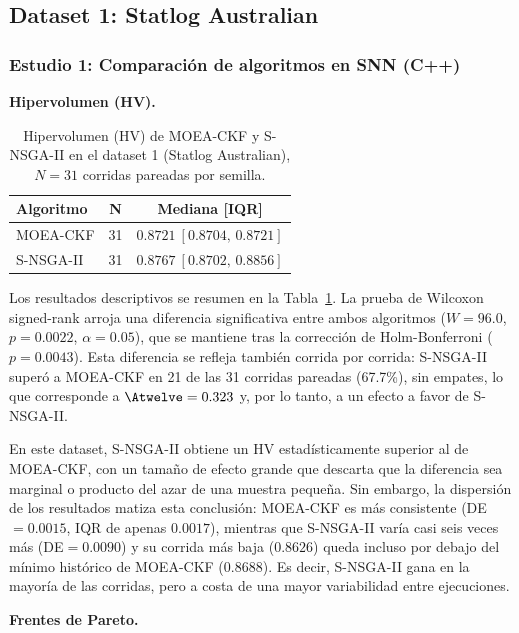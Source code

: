 \subsection{Dataset 1: Statlog Australian}
\label{sec:ds1}

\subsubsection{Estudio 1: Comparación de algoritmos en SNN (C++)}
\label{sec:ds1-estudio1}

\textbf{Hipervolumen (HV).}\label{sec:ds1-hv}

\begin{table}[htbp]
\centering
\small
\caption{Hipervolumen (HV) de MOEA-CKF y S-NSGA-II en el dataset 1 (Statlog Australian), $N=31$
corridas pareadas por semilla.}
\label{tab:hv-ds1}
\begin{tabular}{lcc}
\toprule
\textbf{Algoritmo} & \textbf{N} & \textbf{Mediana [IQR]} \\
\midrule
MOEA-CKF & 31 & $0.8721\ [0.8704,\,0.8721]$ \\
S-NSGA-II & 31 & $0.8767\ [0.8702,\,0.8856]$ \\
\bottomrule
\end{tabular}
\end{table}

Los resultados descriptivos se resumen en la Tabla~\ref{tab:hv-ds1}. La prueba de Wilcoxon signed-rank arroja una diferencia significativa entre ambos algoritmos ($W=96.0$, $p=0.0022$, $\alpha=0.05$), que se mantiene tras la corrección de Holm-Bonferroni ($p=0.0043$). Esta diferencia se refleja también corrida por corrida: S-NSGA-II superó a MOEA-CKF en 21 de las 31 corridas pareadas (67.7\%), sin empates, lo que corresponde a $\Atwelve=0.323$ y, por lo tanto, a un efecto a favor de S-NSGA-II.

En este dataset, S-NSGA-II obtiene un HV estadísticamente superior al de MOEA-CKF, con un tamaño de efecto grande que descarta que la diferencia sea marginal o producto del azar de una muestra pequeña. Sin embargo, la dispersión de los resultados matiza esta conclusión: MOEA-CKF es más consistente (DE$=0.0015$, IQR de apenas $0.0017$), mientras que S-NSGA-II varía casi seis veces más (DE$=0.0090$) y su corrida más baja ($0.8626$) queda incluso por debajo del mínimo histórico de MOEA-CKF ($0.8688$). Es decir, S-NSGA-II gana en la mayoría de las corridas, pero a costa de una mayor variabilidad entre ejecuciones.

\textbf{Frentes de Pareto.}\label{sec:ds1-fronts}

